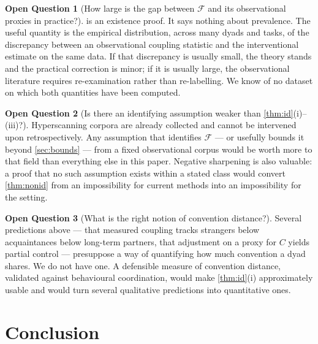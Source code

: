 \documentclass[11pt,a4paper]{article}
\theoremstyle{plain}
\theoremstyle{definition}
\newtheorem{question}{Open Question}
\theoremstyle{remark}
\newcommand{\Fc}{\mathcal{F}}
\begin{document}
\begin{question}[How large is the gap between $\Fc$ and its observational proxies in practice?]\label{q:size}
 is an existence proof. It says nothing about prevalence. The useful quantity is the empirical
distribution, across many dyads and tasks, of the discrepancy between an observational coupling statistic and the
interventional estimate on the same data. If that discrepancy is usually small, the theory stands and the
practical correction is minor; if it is usually large, the observational literature requires re-examination
rather than re-labelling. We know of no dataset on which both quantities have been computed.
\end{question}

\begin{question}[Is there an identifying assumption weaker than \cref{thm:id}(i)--(iii)?]\label{q:weaker}
Hyperscanning corpora are already collected and cannot be intervened upon retrospectively. Any assumption that
identifies $\Fc$ --- or usefully bounds it beyond \cref{sec:bounds} --- from a fixed observational corpus would be
worth more to that field than everything else in this paper. Negative sharpening is also valuable: a proof that
no such assumption exists within a stated class would convert \cref{thm:nonid} from an impossibility for current
methods into an impossibility for the setting.
\end{question}

\begin{question}[What is the right notion of convention distance?]\label{q:distance}
Several predictions above --- that measured coupling tracks strangers below acquaintances below long-term
partners, that adjustment on a proxy for $C$ yields partial control --- presuppose a way of quantifying how much
convention a dyad shares. We do not have one. A defensible measure of convention distance, validated against
behavioural coordination, would make \cref{thm:id}(i) approximately usable and would turn several qualitative
predictions into quantitative ones.
\end{question}

\section{Conclusion}\label{sec:conclusion}
\end{document}
